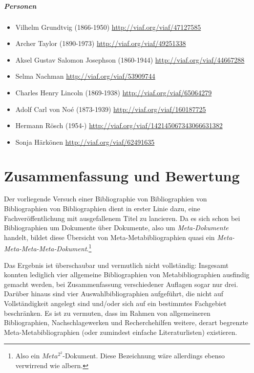 \documentclass[a4paper,
fontsize=11pt,
oneside,
numbers=noperiodatend,
parskip=half-,
bibliography=totoc,
final
]{scrartcl}
\providecommand{\tightlist}{%
  \setlength{\itemsep}{0pt}\setlength{\parskip}{0pt}}
\begin{document}
\subparagraph{Personen}\label{personen}

\begin{itemize}
\tightlist
\item
  Vilhelm Grundtvig (1866-1950) \url{http://viaf.org/viaf/47127585}
\item
  Archer Taylor (1890-1973) \url{http://viaf.org/viaf/49251338}
\item
  Aksel Gustav Salomon Josephson (1860-1944)
  \url{http://viaf.org/viaf/44667288}
\item
  Selma Nachman \url{http://viaf.org/viaf/53909744}
\item
  Charles Henry Lincoln (1869-1938) \url{http://viaf.org/viaf/65064279}
\item
  Adolf Carl von Noé (1873-1939) \url{http://viaf.org/viaf/160187725}
\item
  Hermann Rösch (1954-) \url{http://viaf.org/viaf/142145067343066631382}
\item
  Sonja Härkönen \url{http://viaf.org/viaf/62491635}
\end{itemize}

\section*{Zusammenfassung und
Bewertung}\label{zusammenfassung-und-bewertung}

Der vorliegende Versuch einer Bibliographie von Bibliographien von
Bibliographien von Bibliographien dient in erster Linie dazu, eine
Fachveröffentlichung mit ausgefallenem Titel zu lancieren. Da es sich
schon bei Bibliographien um Dokumente über Dokumente, also um
\emph{Meta-Dokumente} handelt, bildet diese Übersicht von
Meta-Metabibliographien quasi ein \emph{Meta-
Meta-Meta-Meta-Dokument}.\footnote{Also ein \(Meta^{2^2}\)-Dokument.
  Diese Bezeichnung wäre allerdings ebenso verwirrend wie albern.}

Das Ergebnis ist überschaubar und vermutlich nicht vollständig:
Insgesamt konnten lediglich vier allgemeine Bibliographien von
Metabibliographien ausfindig gemacht werden, bei Zusammenfassung
verschiedener Auflagen sogar nur drei. Darüber hinaus sind vier
Auswahlbibliographien aufgeführt, die nicht auf Vollständigkeit angelegt
sind und/oder sich auf ein bestimmtes Fachgebiet beschränken. Es ist zu
vermuten, dass im Rahmen von allgemeineren Bibliographien,
Nachschlagewerken und Recherchehilfen weitere, derart begrenzte
Meta-Meta\-biblio\-graphien (oder zumindest einfache Literaturlisten)
existieren.
\end{document}
